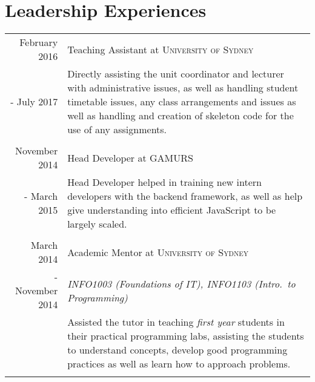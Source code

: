 \documentclass[10pt]{article}
\begin{document}
\section{Leadership Experiences} 
\begin{tabular}{r p{11cm}}
February 2016 & Teaching Assistant at \textsc{University of Sydney} \\ - July 2017 & \footnotesize{Directly assisting the unit coordinator and lecturer with administrative issues, as well as handling student timetable issues, any class arrangements and issues as well as handling and creation of skeleton code for the use of any assignments.}\\\multicolumn{2}{c}{} \\
November 2014 & Head Developer at \textsc{GAMURS} \\ - March 2015 & \footnotesize{Head Developer helped in training new intern developers with the backend framework, as well as help give understanding into efficient JavaScript to be largely scaled.}\\\multicolumn{2}{c}{} \\
March 2014 & Academic Mentor at \textsc{University of Sydney} \\  - November 2014 & \emph{INFO1003 (Foundations of IT), INFO1103 (Intro.\ to Programming)} \\ & \footnotesize{Assisted the tutor in teaching \emph{first year} students in their practical programming labs, assisting the students to understand concepts, develop good programming practices as well as learn how to approach problems.}\\\multicolumn{2}{c}{} \\
\end{tabular}


\end{document}
